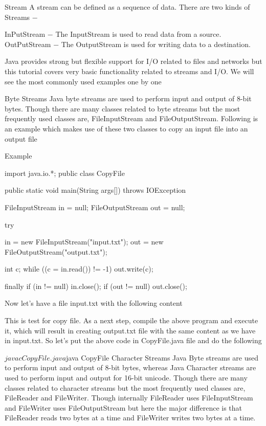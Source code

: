 Stream
A stream can be defined as a sequence of data. There are two kinds of Streams −

InPutStream − The InputStream is used to read data from a source.
OutPutStream − The OutputStream is used for writing data to a destination.


Java provides strong but flexible support for I/O related to files and networks but this tutorial covers very basic functionality related to streams and I/O. We will see the most commonly used examples one by one

Byte Streams
Java byte streams are used to perform input and output of 8-bit bytes. Though there are many classes related to byte streams but the most frequently used classes are, FileInputStream and FileOutputStream. Following is an example which makes use of these two classes to copy an input file into an output file

Example

import java.io.*;
public class CopyFile {

   public static void main(String args[]) throws IOException {
      FileInputStream in = null;
      FileOutputStream out = null;

      try {
         in = new FileInputStream("input.txt");
         out = new FileOutputStream("output.txt");

         int c;
         while ((c = in.read()) != -1) {
            out.write(c);
         }
      }finally {
         if (in != null) {
            in.close();
         }
         if (out != null) {
            out.close();
         }
      }
   }
}
Now let's have a file input.txt with the following content

This is test for copy file.
As a next step, compile the above program and execute it, which will result in creating output.txt file with the same content as we have in input.txt. So let's put the above code in CopyFile.java file and do the following

$javac CopyFile.java
$java CopyFile
Character Streams
Java Byte streams are used to perform input and output of 8-bit bytes, whereas Java Character streams are used to perform input and output for 16-bit unicode. Though there are many classes related to character streams but the most frequently used classes are, FileReader and FileWriter. Though internally FileReader uses FileInputStream and FileWriter uses FileOutputStream but here the major difference is that FileReader reads two bytes at a time and FileWriter writes two bytes at a time.

